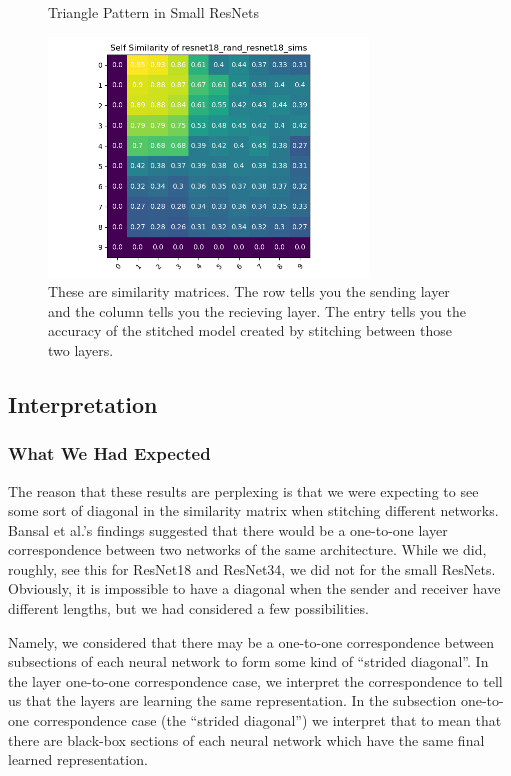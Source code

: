\documentclass{article} %
\begin{document}
\label{Figure5}
\begin{center}
   \begin{figure}[h!]
      \centering
      \caption{Triangle Pattern in Small ResNets}
      \includegraphics[width=8.5cm]{resnet18_rand_resnet18_sims.png}
      \caption*{These are similarity matrices. The row tells you the sending layer and the column tells you the recieving layer.
      The entry tells you the accuracy of the stitched model created by stitching between those two layers.}
   \end{figure}
\end{center}

\subsection*{Interpretation}
\subsubsection*{What We Had Expected}
The reason that these results are perplexing is that we were expecting to see some sort of diagonal in the similarity matrix
when stitching
different networks. Bansal et al.'s findings suggested that there would be a one-to-one layer correspondence between
two networks of the same architecture. While we did, roughly, see this for ResNet18 and ResNet34, we did not for the
small ResNets. Obviously, it is impossible to have a diagonal when the sender and receiver have different lengths,
but we had considered a few possibilities.

Namely, we considered that there may be a one-to-one correspondence between subsections of each neural network to
form some kind of ``strided diagonal''. In the layer one-to-one correspondence case, we interpret the correspondence
to tell us that the layers are learning the same representation. In the subsection one-to-one correspondence case
(the ``strided diagonal'') we interpret that to mean that there are black-box sections of each neural network which
have the same final learned representation.
\end{document}
